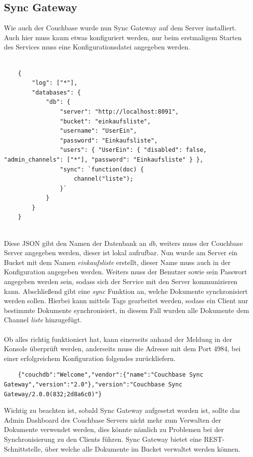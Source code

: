 \subsection{Sync Gateway}

Wie auch der Couchbase wurde nun Sync Gateway auf dem Server installiert. Auch hier muss kaum etwas konfiguriert werden, nur beim erstmaligem Starten des Services muss eine Konfigurationsdatei angegeben werden.
\\\\
\begin{verbatim}
	{
		"log": ["*"],
		"databases": {
			"db": {
				"server": "http://localhost:8091",
				"bucket": "einkaufsliste",
				"username": "UserEin",
				"password": "Einkaufsliste",
				"users": { "UserEin": { "disabled": false, "admin_channels": ["*"], "password": "Einkaufsliste" } },
				"sync": `function(doc) {
					channel("liste");
				}`
			}
		}
	}
	
\end{verbatim}

Diese JSON gibt den Namen der Datenbank an \textit{db}, weiters muss der Couchbase Server angegeben werden, dieser ist lokal aufrufbar. Nun wurde am Server ein Bucket mit dem Namen \textit{einkaufsliste} erstellt, dieser Name muss auch in der Konfiguration angegeben werden. Weiters muss der Benutzer sowie sein Passwort angegeben werden sein, sodass sich der Service mit den Server kommunizieren kann. Abschließend gibt eine \textit{sync} Funktion an, welche Dokumente synchronisiert werden sollen. Hierbei kann mittels Tags gearbeitet werden, sodass ein Client nur bestimmte Dokumente synchronisiert, in diesem Fall wurden alle Dokumente dem Channel \textit{liste} hinzugefügt.
\\\\
Ob alles richtig funktioniert hat, kann einerseits anhand der Meldung in der Konsole überprüft werden, anderseits muss die Adresse mit dem Port 4984, bei einer erfolgreichem Konfiguration folgendes zurückliefern. 

\begin{verbatim}
	{"couchdb":"Welcome","vendor":{"name":"Couchbase Sync Gateway","version":"2.0"},"version":"Couchbase Sync Gateway/2.0.0(832;2d8a6c0)"}
\end{verbatim}

Wichtig zu beachten ist, sobald Sync Gateway aufgesetzt worden ist, sollte das Admin Dashboard des Couchbase Servers nicht mehr zum Verwalten der Dokumente verwendet werden, dies könnte nämlich zu Problemen bei der Synchronisierung zu den Clients führen. Sync Gateway bietet eine REST-Schnittstelle, über welche alle Dokumente im Bucket verwaltet werden können. \cite{syncgateway} 

